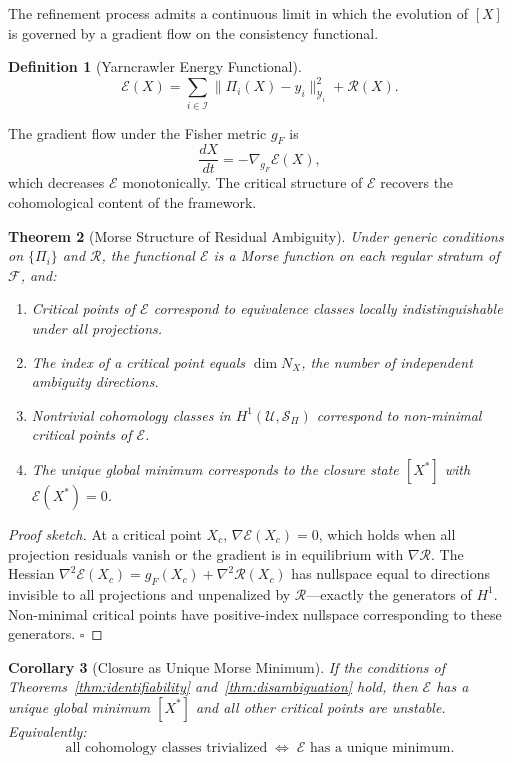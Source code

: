 \documentclass[12pt, oneside]{article}
\newtheorem{theorem}{Theorem}[section]
\newtheorem{corollary}[theorem]{Corollary}
\newtheorem{definition}[theorem]{Definition}
\begin{document}
The refinement process admits a continuous limit in which the evolution of $[X]$ is
governed by a gradient flow on the consistency functional.

\begin{definition}[Yarncrawler Energy Functional]
\[
\mathcal{E}(X) = \sum_{i \in \mathcal{I}} \|\Pi_i(X) - y_i\|_{\mathcal{Y}_i}^2
+ \mathcal{R}(X).
\]
\end{definition}

The gradient flow under the Fisher metric $g_F$ is
\[
\frac{dX}{dt} = -\nabla_{g_F} \mathcal{E}(X),
\]
which decreases $\mathcal{E}$ monotonically. The critical structure of $\mathcal{E}$
recovers the cohomological content of the framework.

\begin{theorem}[Morse Structure of Residual Ambiguity]
\label{thm:morse}
Under generic conditions on $\{\Pi_i\}$ and $\mathcal{R}$, the functional $\mathcal{E}$
is a Morse function on each regular stratum of $\mathcal{F}$, and:
\begin{enumerate}
\item[(i)] Critical points of $\mathcal{E}$ correspond to equivalence classes locally
indistinguishable under all projections.
\item[(ii)] The index of a critical point equals $\dim N_X$, the number of independent
ambiguity directions.
\item[(iii)] Nontrivial cohomology classes in $H^1(\mathcal{U}, \mathcal{S}_\Pi)$
correspond to non-minimal critical points of $\mathcal{E}$.
\item[(iv)] The unique global minimum corresponds to the closure state $[X^*]$ with
$\mathcal{E}(X^*) = 0$.
\end{enumerate}
\end{theorem}

\begin{proof}[Proof sketch]
At a critical point $X_c$, $\nabla\mathcal{E}(X_c) = 0$, which holds when all projection
residuals vanish or the gradient is in equilibrium with $\nabla\mathcal{R}$. The Hessian
$\nabla^2\mathcal{E}(X_c) = g_F(X_c) + \nabla^2\mathcal{R}(X_c)$ has nullspace equal to
directions invisible to all projections and unpenalized by $\mathcal{R}$---exactly
the generators of $H^1$. Non-minimal critical points have positive-index nullspace
corresponding to these generators. $\square$
\end{proof}

\begin{corollary}[Closure as Unique Morse Minimum]
If the conditions of Theorems~\ref{thm:identifiability} and~\ref{thm:disambiguation}
hold, then $\mathcal{E}$ has a unique global minimum $[X^*]$ and all other critical points
are unstable. Equivalently:
\[
\text{all cohomology classes trivialized}
\;\Longleftrightarrow\;
\mathcal{E} \text{ has a unique minimum}.
\]
\end{corollary}
\end{document}
